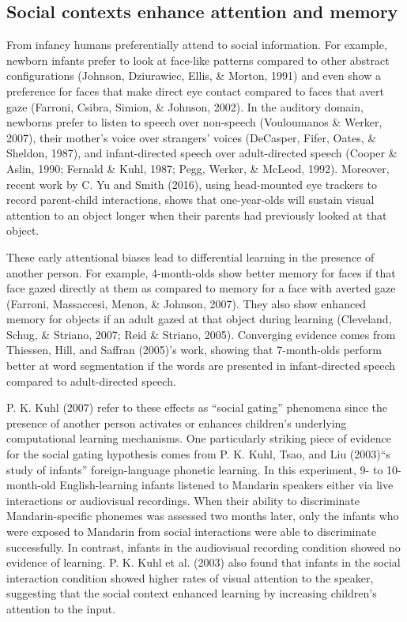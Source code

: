 \documentclass[english,floatsintext,man]{apa6}
\theoremstyle{definition}
\theoremstyle{definition}
\theoremstyle{definition}
\theoremstyle{remark}
\begin{document}
\subsection{Social contexts enhance attention and
memory}\label{social-contexts-enhance-attention-and-memory}

From infancy humans preferentially attend to social information. For
example, newborn infants prefer to look at face-like patterns compared
to other abstract configurations (Johnson, Dziurawiec, Ellis, \& Morton,
1991) and even show a preference for faces that make direct eye contact
compared to faces that avert gaze (Farroni, Csibra, Simion, \& Johnson,
2002). In the auditory domain, newborns prefer to listen to speech over
non-speech (Vouloumanos \& Werker, 2007), their mother's voice over
strangers' voices (DeCasper, Fifer, Oates, \& Sheldon, 1987), and
infant-directed speech over adult-directed speech (Cooper \& Aslin,
1990; Fernald \& Kuhl, 1987; Pegg, Werker, \& McLeod, 1992). Moreover,
recent work by C. Yu and Smith (2016), using head-mounted eye trackers
to record parent-child interactions, shows that one-year-olds will
sustain visual attention to an object longer when their parents had
previously looked at that object.

These early attentional biases lead to differential learning in the
presence of another person. For example, 4-month-olds show better memory
for faces if that face gazed directly at them as compared to memory for
a face with averted gaze (Farroni, Massaccesi, Menon, \& Johnson, 2007).
They also show enhanced memory for objects if an adult gazed at that
object during learning (Cleveland, Schug, \& Striano, 2007; Reid \&
Striano, 2005). Converging evidence comes from Thiessen, Hill, and
Saffran (2005)'s work, showing that 7-month-olds perform better at word
segmentation if the words are presented in infant-directed speech
compared to adult-directed speech.

P. K. Kuhl (2007) refer to these effects as \enquote{social gating}
phenomena since the presence of another person activates or enhances
children's underlying computational learning mechanisms. One
particularly striking piece of evidence for the social gating hypothesis
comes from P. K. Kuhl, Tsao, and Liu (2003)\enquote{s study of infants}
foreign-language phonetic learning. In this experiment, 9- to
10-month-old English-learning infants listened to Mandarin speakers
either via live interactions or audiovisual recordings. When their
ability to discriminate Mandarin-specific phonemes was assessed two
months later, only the infants who were exposed to Mandarin from social
interactions were able to discriminate successfully. In contrast,
infants in the audiovisual recording condition showed no evidence of
learning. P. K. Kuhl et al. (2003) also found that infants in the social
interaction condition showed higher rates of visual attention to the
speaker, suggesting that the social context enhanced learning by
increasing children's attention to the input.
\end{document}
